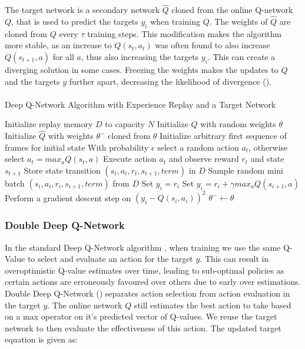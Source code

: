 The target network is a secondary network $\hat{Q}$ cloned from the online Q-network $Q$, that is used to predict the targets $y_i$ when training $Q$. The weights of $\hat{Q}$ are cloned from $Q$ every $\tau$ training steps. This modification makes the algorithm more stable, as an increase to $Q(s_t, a_t)$ was often found to also increase $Q(s_{t+1}, a)$ for all $a$, thus also increasing the targets $y_i$. This can create a diverging solution in some cases. Freezing the weights makes the updates to $Q$ and the targets $y$ further apart, decreasing the likelihood of divergence (\citet{human}). \paragraph{}

\begin{algorithm}
    \caption{Deep Q-Network Algorithm with Experience Replay and a Target Network}\label{alg:DQN}
    \begin{algorithmic}[1]
        \State Initialize replay memory $D$ to capacity $N$
        \State Initialize $Q$ with random weights $\theta$
        \State Initialize $\hat{Q}$ with weights $\theta^-$ cloned from $\theta$
        \State Initialize arbitrary first sequence of frames for initial state
        \State With probability $\epsilon$ select a random action $a_t$, otherwise select $a_t = max_a Q(s_t, a)$
        \State Execute action $a_t$ and observe reward $r_t$ and state $s_{t+1}$
        \State Store state transition $(s_t, a_t, r_t, s_{t+1}, term)$ in $D$
        \State Sample random mini batch $(s_i, a_i, r_i, s_{i + 1}, term)$ from $D$
        \State Set $y_i = r_i$
        \Else
        \State Set $y_i = r_i + \gamma max_a Q(s_{i+1}, a)$ \label{DQN:target}
        \EndIf
        \EndFor
        \State Perform a gradient descent step on $(y_i - Q(s_i, a_i))^2$
        $\theta^- \leftarrow \theta$
        \EndIf
        \EndFor
    \end{algorithmic}
\end{algorithm}

\subsubsection{Double Deep Q-Network}
In the standard Deep Q-Network algorithm , when training we use the same Q-Value to select and evaluate an action for the target $y$. This can result in overoptimistic Q-value estimates over time, leading to sub-optimal policies as certain actions are erroneously favoured over others due to early over estimations. Double Deep Q-Network (\citet{doubleq}) separates action selection from action evaluation in the target $y$. The online network $Q$ still estimates the best action to take based on a max operator on it's predicted vector of Q-values. We reuse the target network to then evaluate the effectiveness of this action. The updated target equation is given as:

